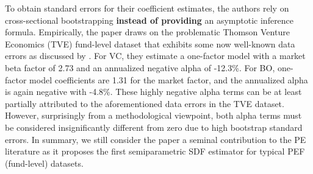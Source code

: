 \documentclass[12pt]{article}
\begin{document}
To obtain standard errors for their coefficient estimates, the authors rely on cross-sectional bootstrapping \textbf{instead of providing} an asymptotic inference formula.
Empirically, the paper draws on the problematic Thomson Venture Economics (TVE) fund-level dataset that exhibits some now well-known data errors as discussed by \cite{HJK14}.
For VC, they estimate a one-factor model with a market beta factor of 2.73 and an annualized negative alpha of -12.3\%. For BO, one-factor model coefficients are 1.31 for the market factor, and the annualized alpha is again negative with -4.8\%.
These highly negative alpha terms can be at least partially attributed to the aforementioned data errors in the TVE dataset.
However, surprisingly from a methodological viewpoint, both alpha terms must be considered insignificantly different from zero due to high bootstrap standard errors.
In summary, we still consider the \cite{DLP12} paper a seminal contribution to the PE literature as it proposes the first semiparametric SDF estimator for typical PEF (fund-level) datasets.  
\end{document}
